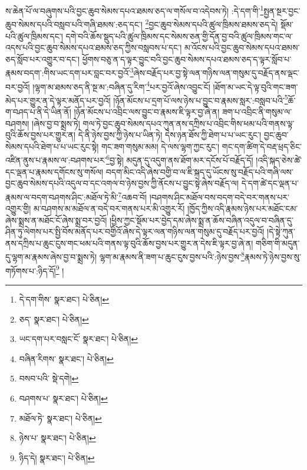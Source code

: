 ས་ཆེན་པོ་ལ་བཞུགས་པའི་བྱང་ཆུབ་སེམས་དཔའ་ཐམས་ཅད་ལ་གསོལ་བ་འདེབས་ཏེ། :དེ་དག་གི་\footnote{དེ་དག་གིས་  སྣར་ཐང་།  པེ་ཅིན། }སྤྱན་སྔར་བྱང་ཆུབ་སེམས་དཔའི་བསླབ་པའི་གཞི་ཐམས་:ཅད་དང་། \footnote{ཅད་  སྣར་ཐང་།  པེ་ཅིན། }བྱང་ཆུབ་སེམས་དཔའི་ཚུལ་ཁྲིམས་ཐམས་ཅད་དེ། སྡོམ་པའི་ཚུལ་ཁྲིམས་དང་། དགེ་བའི་ཆོས་སྡུད་པའི་ཚུལ་ཁྲིམས་དང་སེམས་ཅན་གྱི་དོན་བྱ་བའི་ཚུལ་ཁྲིམས་གང་ལ་འདས་པའི་བྱང་ཆུབ་སེམས་དཔའ་ཐམས་ཅད་ཀྱིས་བསླབས་པ་དང་། མ་འོངས་པའི་བྱང་ཆུབ་སེམས་དཔའ་ཐམས་ཅད་སློབ་པར་འགྱུར་བ་དང་། ཕྱོགས་བཅུ་ན་ད་ལྟར་བྱུང་བའི་བྱང་ཆུབ་སེམས་དཔའ་ཐམས་ཅད་ད་ལྟར་སློབ་པ་རྣམས་བདག་:གིས་ཡང་དག་པར་བླང་བར་བྱའོ་\footnote{ཡང་དག་པར་བསླང་ངོ་  སྣར་ཐང་།  པེ་ཅིན། }ཞེས་བརྗོད་པར་བྱ་སྟེ་ལན་གཉིས་ལན་གསུམ་དུ་བརྗོད་ནས་ལྡང་བར་བྱའོ། །ལྷག་མ་ཐམས་ཅད་ནི་སྔ་མ་:བཞིན་དུ་རིག་\footnote{བཞིན་རིགས་  སྣར་ཐང་།  པེ་ཅིན། }པར་བྱའོ་ཞེས་འབྱུང་ངོ། །ཐོག་མ་ཡང་དེ་ལྟ་བུའི་གང་ཟག་མེད་པར་གྱུར་ན་དེ་ལྟར་མནོད་པར་བྱའོ། །ཉོན་མོངས་པ་དྲག་པོ་ལས་ཉེས་པ་བྱུང་བ་རྣམས་སླར་:བསླབ་པའི་\footnote{བསབ་པའི་  སྡེ་དགེ། }ཆོ་ག་བཤད་པ་ནི་དེ་ཡིན་ནོ། །ཉོན་མོངས་པ་འབྲིང་ལས་བྱུང་བ་རྣམས་ཇི་ལྟར་བྱ་ཞེ་ན། ཟག་པ་འབྲིང་ནི་གསུམ་ལ་བཤགས། །ཞེས་བྱ་བ་སྨྲས་ཏེ། གལ་ཏེ་བྱང་ཆུབ་སེམས་དཔའ་ཀུན་ནས་དཀྲིས་པ་འབྲིང་གིས་ཕམ་པའི་གནས་ལྟ་བུའི་ཆོས་བྱས་པར་གྱུར་ན། དེ་ནི་ཉེས་བྱས་ཀྱི་ཉེས་པ་ཡིན་ཏེ། དེས་ཉན་ཐོས་ཀྱི་ཐེག་པ་པ་ཡང་རུང་། བྱང་ཆུབ་སེམས་དཔའི་ཐེག་པ་པ་ཡང་རུང་སྟེ། གང་ཟག་གསུམ་མམ། དེ་ལས་ལྷག་ཀྱང་རུང་། གང་དག་ཚིག་དེ་བརྡ་ཕྲད་ཅིང་འཛིན་ནུས་པ་རྣམས་ལ་:བཤགས་པར་\footnote{བཤགས་པ་  སྣར་ཐང་།  པེ་ཅིན། }བྱ་སྟེ། མདུན་དུ་འདུག་ནས་ཐོག་མར་དངོས་པོ་བརྗོད་དོ། །འདི་སྐད་ཅེས་ཚེ་དང་ལྡན་པ་རྣམས་དགོངས་སུ་གསོལ། བདག་མིང་འདི་ཞེས་བགྱི་བ་ལ་ཇི་སྐད་དུ་ཡོངས་སུ་བརྗོད་པའི་གཞི་ལས་བྱང་ཆུབ་སེམས་དཔའི་འདུལ་བ་དང་འགལ་བ་ཉེས་བྱས་ཀྱི་ནོངས་པ་བྱུང་སྟེ་ཞེས་བརྗོད་ལ། དེ་དག་ཚེ་དང་ལྡན་པ་རྣམས་ལ་བདག་བཤགས་ཤིང་:མཐོལ་ཏེ་མི་\footnote{མཐོལ་ཏེ་  སྣར་ཐང་།  པེ་ཅིན། }འཆབ་བོ། །བཤགས་ཤིང་མཐོལ་བས་བདག་བདེ་བར་གནས་པར་འགྱུར་གྱི། མ་བཤགས་མ་མཐོལ་ན་བདེ་བར་གནས་པར་མི་འགྱུར་རོ། །ཁྱོད་ཀྱིས་འདི་རྣམས་ཉེས་པར་མཐོང་ངམ་ཞེས་སྨྲས་ན་མཐོང་ངོ་ཞེས་སྨྲ་བར་བྱའོ། །ཕྱིས་ཀྱང་སྡོམ་པར་བྱེད་དམ་ཞེས་སྨྲ་ན་ཆོས་བཞིན་འདུལ་བ་བཞིན་དུ་ཤིན་ཏུ་ལེགས་པར་སྤྱི་བོས་མནོད་པར་བགྱིའོ་ཞེས་དེ་ལྟར་ལན་གཉིས་ལན་གསུམ་དུ་བརྗོད་པར་བྱའོ། །དེ་སྟེ་ཀུན་ནས་དཀྲིས་པ་ཆུང་ངུས་གང་ཕམ་པའི་གནས་ལྟ་བུའི་ཆོས་བྱས་པར་གྱུར་ན་དེས་ཇི་ལྟར་བྱ་ཞེ་ན། གཅིག་གི་མདུན་དུ་ལྷག་མ་རྣམས་ཞེས་བྱ་བ་སྨྲས་ཏེ། ལྷག་མ་རྣམས་ནི་ཟག་པ་ཆུང་ངུས་བྱས་པའི་:ཉེས་བྱས་\footnote{ཉེས་པ་  སྣར་ཐང་།  པེ་ཅིན། }རྣམས་ཏེ་ཉེས་བྱས་སུ་གཏོགས་པ་:ཉིད་དོ།\footnote{ཉིད་དེ།  སྣར་ཐང་།  པེ་ཅིན། } །
